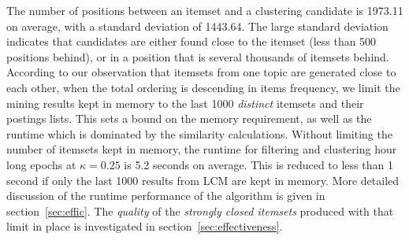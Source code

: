 \documentclass[letterpaper,12pt,titlepage,oneside,final]{book}
\begin{document}
The number of positions between an itemset
and a clustering candidate is 1973.11 on average,
with a standard deviation of 1443.64. 
The large standard deviation indicates that
candidates are either found close to the itemset
(less than 500 positions behind),
or in a position that is several thousands 
of itemsets behind.
According to our observation that itemsets 
from one topic are generated close to each other, 
when the total ordering is descending in items frequency,
we limit the mining results kept in memory 
to the last 1000 \emph{distinct} itemsets and their postings lists.
This sets a bound on the memory requirement,
as well as the runtime which is 
dominated by the
similarity calculations. %
Without limiting
the number of itemsets kept in memory,
the runtime 
for filtering and clustering hour long epochs %
at $\kappa = 0.25$  
is 5.2 seconds on average.
This is reduced to less than 1 second
if only the last 1000 results from LCM 
are kept in memory. 
More detailed discussion of the runtime performance
of the algorithm is given in section~\ref{sec:effic}.
The \emph{quality} of the \emph{strongly closed itemsets} 
produced with that limit in place
is investigated in section~\ref{sec:effectiveness}.

\end{document}
